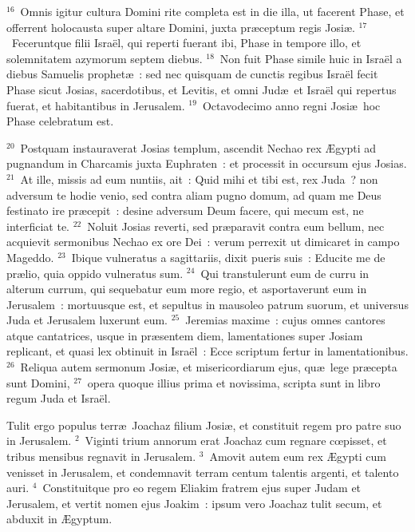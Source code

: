 ${}^{16}$~Omnis igitur cultura Domini rite completa est in die illa, ut facerent Phase, et offerrent holocausta super altare Domini, juxta pr\ae ceptum regis Josi\ae .
${}^{17}$~Feceruntque filii Isra\"el, qui reperti fuerant ibi, Phase in tempore illo, et solemnitatem azymorum septem diebus.
${}^{18}$~Non fuit Phase simile huic in Isra\"el a diebus Samuelis prophet\ae~: sed nec quisquam de cunctis regibus Isra\"el fecit Phase sicut Josias, sacerdotibus, et Levitis, et omni Jud\ae\ et Isra\"el qui repertus fuerat, et habitantibus in Jerusalem.
${}^{19}$~Octavodecimo anno regni Josi\ae\ hoc Phase celebratum est.


${}^{20}$~Postquam instauraverat Josias templum, ascendit Nechao rex \AE gypti ad pugnandum in Charcamis juxta Euphraten~: et processit in occursum ejus Josias.
${}^{21}$~At ille, missis ad eum nuntiis, ait~: Quid mihi et tibi est, rex Juda~? non adversum te hodie venio, sed contra aliam pugno domum, ad quam me Deus festinato ire pr\ae cepit~: desine adversum Deum facere, qui mecum est, ne interficiat te.
${}^{22}$~Noluit Josias reverti, sed pr\ae paravit contra eum bellum, nec acquievit sermonibus Nechao ex ore Dei~: verum perrexit ut dimicaret in campo Mageddo.
${}^{23}$~Ibique vulneratus a sagittariis, dixit pueris suis~: Educite me de pr\ae lio, quia oppido vulneratus sum.
${}^{24}$~Qui transtulerunt eum de curru in alterum currum, qui sequebatur eum more regio, et asportaverunt eum in Jerusalem~: mortuusque est, et sepultus in mausoleo patrum suorum, et universus Juda et Jerusalem luxerunt eum.
${}^{25}$~Jeremias maxime~: cujus omnes cantores atque cantatrices, usque in pr\ae sentem diem, lamentationes super Josiam replicant, et quasi lex obtinuit in Isra\"el~: Ecce scriptum fertur in lamentationibus.
${}^{26}$~Reliqua autem sermonum Josi\ae , et misericordiarum ejus, qu\ae\ lege pr\ae cepta sunt Domini,
${}^{27}$~opera quoque illius prima et novissima, scripta sunt in libro regum Juda et Isra\"el.

\bchapter
\lettrine[lines=3,image=true,loversize=0.05,lraise=-0.03]{T}{}ulit ergo populus terr\ae\ Joachaz filium Josi\ae , et constituit regem pro patre suo in Jerusalem.
${}^{2}$~Viginti trium annorum erat Joachaz cum regnare cœpisset, et tribus mensibus regnavit in Jerusalem.
${}^{3}$~Amovit autem eum rex \AE gypti cum venisset in Jerusalem, et condemnavit terram centum talentis argenti, et talento auri.
${}^{4}$~Constituitque pro eo regem Eliakim fratrem ejus super Judam et Jerusalem, et vertit nomen ejus Joakim~: ipsum vero Joachaz tulit secum, et abduxit in \AE gyptum.


